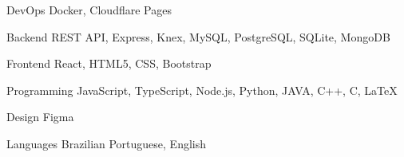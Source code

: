 

\begin{cvskills}

  \cvskill
    {DevOps} %
    {Docker, Cloudflare Pages} %

  \cvskill
    {Backend} %
    {REST API, Express, Knex, MySQL, PostgreSQL, SQLite, MongoDB} %

  \cvskill
    {Frontend} %
    {React, HTML5, CSS, Bootstrap} %

  \cvskill
    {Programming} %
    {JavaScript, TypeScript, Node.js, Python, JAVA, C++, C, LaTeX} %

  \cvskill
    {Design} %
    {Figma} %

  \cvskill
    {Languages} %
    {Brazilian Portuguese, English} %

\end{cvskills}
